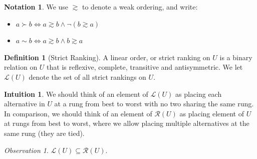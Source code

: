 \documentclass{book}
\theoremstyle{plain}
\theoremstyle{definition}
\newtheorem{definition}[theorem]{Definition}
\newtheorem{notation}[theorem]{Notation}
\newtheorem{intuition}[theorem]{Intuition}
\theoremstyle{remark}
\newtheorem{observation}[theorem]{Observation}
\begin{document}
\begin{notation}
    We use $\gtrsim$ to denote a weak ordering, 
    and write:
    \begin{itemize}
        \item $a \succ b \iff a \gtrsim b \land \lnot (b \gtrsim a)$
        \item $a \sim b \iff a \gtrsim b \land b \gtrsim a$
    \end{itemize}
\end{notation}

\begin{definition}[Strict Ranking]
    A linear order, or strict ranking on $U$ is a binary relation on
    $U$ that is reflexive, complete, transitive and antisymmetric.
    We let $\mathcal{L}(U)$ denote the set of all strict rankings on $U$.
\end{definition}

\begin{intuition}
    We should think of 
    an element of $\mathcal{L}(U)$ 
    as placing each alternative in $U$ at a rung from best to 
    worst with no two sharing the same rung.
    In comparison, we should think of an element of $\mathcal{R}(U)$ as 
    placing element of 
    $U$ at rungs from best to worst, where we allow placing multiple 
    alternatives at the same rung (they are tied).
\end{intuition}

\begin{observation}
    $\mathcal{L}(U) \subseteq \mathcal{R}(U)$.
\end{observation}
\end{document}
